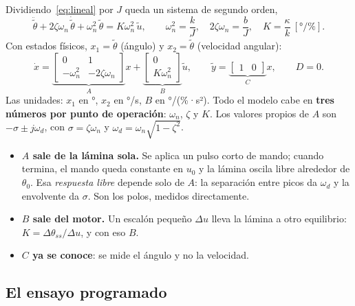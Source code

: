 \documentclass[11pt,letterpaper]{article}
\begin{document}
Dividiendo~\eqref{eq:lineal} por $J$ queda un sistema de segundo orden,
\begin{equation}
\ddot{\tilde\theta} + 2\zeta\omega_n\,\dot{\tilde\theta} + \omega_n^2\,\tilde\theta = K\omega_n^2\,\tilde u,
\qquad
\omega_n^2=\frac{k}{J},\quad 2\zeta\omega_n=\frac{b}{J},\quad K=\frac{\kappa}{k}\ [\text{°/\%}].
\label{eq:segundo}
\end{equation}
Con estados físicos, $x_1=\tilde\theta$ (ángulo) y $x_2=\dot{\tilde\theta}$ (velocidad angular):
\begin{equation}
\dot x=\underbrace{\begin{bmatrix}0 & 1\\ -\omega_n^2 & -2\zeta\omega_n\end{bmatrix}}_{A}x
+\underbrace{\begin{bmatrix}0\\ K\omega_n^2\end{bmatrix}}_{B}\tilde u,
\qquad
\tilde y=\underbrace{\begin{bmatrix}1 & 0\end{bmatrix}}_{C}x,\qquad D=0.
\label{eq:ss}
\end{equation}
Las unidades: $x_1$ en °, $x_2$ en °/s, $B$ en °/(\%·s²). Todo el modelo cabe en \textbf{tres números por punto de operación}: $\omega_n$, $\zeta$ y $K$. Los valores propios de $A$ son $-\sigma\pm j\omega_d$, con $\sigma=\zeta\omega_n$ y $\omega_d=\omega_n\sqrt{1-\zeta^2}$.

\begin{nota}
\begin{itemize}[leftmargin=12pt]
  \item \textbf{$A$ sale de la lámina sola.} Se aplica un pulso corto de mando; cuando termina, el mando queda constante en $u_0$ y la lámina oscila libre alrededor de $\theta_0$. Esa \emph{respuesta libre} depende solo de $A$: la separación entre picos da $\omega_d$ y la envolvente da $\sigma$. Son los polos, medidos directamente.
  \item \textbf{$B$ sale del motor.} Un escalón pequeño $\Delta u$ lleva la lámina a otro equilibrio: $K=\Delta\theta_{ss}/\Delta u$, y con eso $B$.
  \item \textbf{$C$ ya se conoce}: se mide el ángulo y no la velocidad.
\end{itemize}
\end{nota}

\subsection{El ensayo programado}
\end{document}
